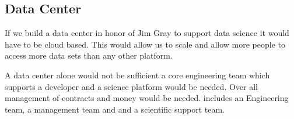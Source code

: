 \subsection{Data Center} \label{sec:dc}

If we build a data center in honor of Jim Gray to support data science  it would have to be cloud based.
This would allow us to scale and allow more people to access more data sets than any other platform.

A data center alone would not be sufficient a core engineering team which supports a developer and a science platform would be needed.
Over all management of contracts and money would be needed.
 includes an Engineering team, a management team and and a scientific support team.






